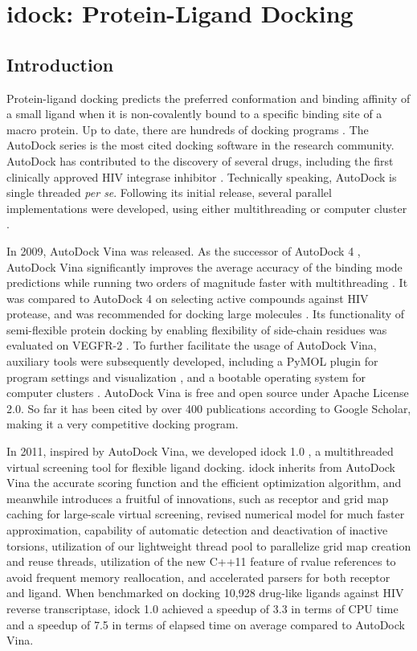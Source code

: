 \chapter{idock: Protein-Ligand Docking}

\section{Introduction}

Protein-ligand docking predicts the preferred conformation and binding affinity of a small ligand when it is non-covalently bound to a specific binding site of a macro protein. Up to date, there are hundreds of docking programs \citep{493,922}. The AutoDock series is the most cited docking software in the research community. AutoDock has contributed to the discovery of several drugs, including the first clinically approved HIV integrase inhibitor \citep{1169}. Technically speaking, AutoDock is single threaded \textit{per se}. Following its initial release, several parallel implementations were developed, using either multithreading or computer cluster \citep{115,560,782}.

In 2009, AutoDock Vina \citep{595} was released. As the successor of AutoDock 4 \citep{596}, AutoDock Vina significantly improves the average accuracy of the binding mode predictions while running two orders of magnitude faster with multithreading \citep{595}. It was compared to AutoDock 4 on selecting active compounds against HIV protease, and was recommended for docking large molecules \citep{556}. Its functionality of semi-flexible protein docking by enabling flexibility of side-chain residues was evaluated on VEGFR-2 \citep{1084}. To further facilitate the usage of AutoDock Vina, auxiliary tools were subsequently developed, including a PyMOL plugin for program settings and visualization \citep{609}, and a bootable operating system for computer clusters \citep{773}. AutoDock Vina is free and open source under Apache License 2.0. So far it has been cited by over 400 publications according to Google Scholar, making it a very competitive docking program.

In 2011, inspired by AutoDock Vina, we developed idock 1.0 \citep{1153}, a multithreaded virtual screening tool for flexible ligand docking. idock inherits from AutoDock Vina the accurate scoring function and the efficient optimization algorithm, and meanwhile introduces a fruitful of innovations, such as receptor and grid map caching for large-scale virtual screening, revised numerical model for much faster approximation, capability of automatic detection and deactivation of inactive torsions, utilization of our lightweight thread pool to parallelize grid map creation and reuse threads, utilization of the new C++11 feature of rvalue references to avoid frequent memory reallocation, and accelerated parsers for both receptor and ligand. When benchmarked on docking 10,928 drug-like ligands against HIV reverse transcriptase, idock 1.0 achieved a speedup of 3.3 in terms of CPU time and a speedup of 7.5 in terms of elapsed time on average compared to AutoDock Vina.

